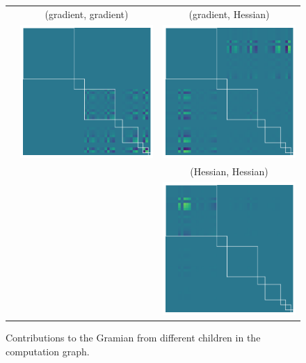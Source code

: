 \begin{figure}
\begin{tabular}{ccc}
    \\
    &
      (gradient, gradient)
    &
      (gradient, Hessian)
    \\
    &
      \includegraphics[width=0.33\linewidth]{../kfac_pinns_exp/exp04_gramian_contributions/fig/gram_grad_input_grad_input.png}
    &
      \includegraphics[width=0.33\linewidth]{../kfac_pinns_exp/exp04_gramian_contributions/fig/gram_grad_input_hess_input.png}
    \\
    &
    &
      (Hessian, Hessian)
    \\
    &
    &
      \includegraphics[width=0.33\linewidth]{../kfac_pinns_exp/exp04_gramian_contributions/fig/gram_hess_input_hess_input.png}
  \end{tabular}
  \caption{Contributions to the Gramian from different children in the
    computation graph.}\label{fig:gramian-contribution-children}
\end{figure}
